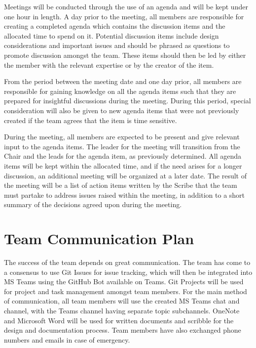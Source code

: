 \documentclass{article}
\begin{document}
\clearpage

Meetings will be conducted through the use of an agenda and will be kept under one hour in length. A day prior to the meeting, all members are responsible for creating a completed agenda which contains the discussion items and the allocated time to spend on it. Potential discussion items include design considerations and important issues and should be phrased as questions to promote discussion amongst the team. These items should then be led by either the member with the relevant expertise or by the creator of the item.  

From the period between the meeting date and one day prior, all members are responsible for gaining knowledge on all the agenda items such that they are prepared for insightful discussions during the meeting. During this period, special consideration will also be given to new agenda items that were not previously created if the team agrees that the item is time sensitive. 

During the meeting, all members are expected to be present and give relevant input to the agenda items. The leader for the meeting will transition from the Chair and the leads for the agenda item, as previously determined. All agenda items will be kept within the allocated time, and if the need arises for a longer discussion, an additional meeting will be organized at a later date. The result of the meeting will be a list of action items written by the Scribe that the team must partake to address issues raised within the meeting, in addition to a short summary of the decisions agreed upon during the meeting. 

\section{Team Communication Plan}

The success of the team depends on great communication. The team has come to a consensus to use Git Issues for issue tracking, which will then be integrated into MS Teams using the GitHub Bot available on Teams. Git Projects will be used for project and task management amongst team members. For the main method of communication, all team members will use the created MS Teams chat and channel, with the Teams channel having separate topic subchannels. OneNote and Microsoft Word will be used for written documents and scribble for the design and documentation process. Team members have also exchanged phone numbers and emails in case of emergency.  
\end{document}
